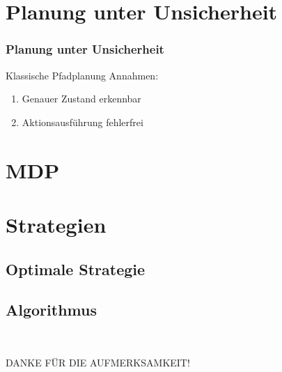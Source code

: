 \documentclass[18pt]{beamer}
\begin{document}
\section{Planung unter Unsicherheit}
\begin{frame}
	\frametitle{Planung unter Unsicherheit}	
	\begin{block}{Klassische Pfadplanung}
		Annahmen:
		\begin{enumerate}
			\item Genauer Zustand erkennbar
			\item Aktionsausführung fehlerfrei
		\end{enumerate}
	\end{block}
\end{frame}

\section{MDP}

\section{Strategien}
\subsection{Optimale Strategie}
\subsection{Algorithmus}

\begin{frame}{~}
	\begin{center}
		\huge{DANKE FÜR DIE AUFMERKSAMKEIT!}
	\end{center}
\end{frame}
\end{document}
